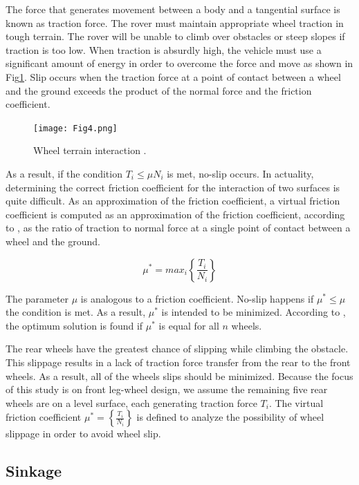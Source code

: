 \documentclass[default,iicol]{sn-jnl}
\theoremstyle{thmstyleone}
\theoremstyle{thmstyletwo}
\theoremstyle{thmstylethree}
\begin{document}
The force that generates movement between a body and a tangential surface is known as traction force. The rover must maintain appropriate wheel traction in tough terrain. The rover will be unable to climb over obstacles or steep slopes if traction is too low. When traction is absurdly high, the vehicle must use a significant amount of energy in order to overcome the force and move as shown in Fig\ref{fig4}. Slip occurs when the traction force at a point of contact between a wheel and the ground exceeds the product of the normal force and the friction coefficient.

\begin{figure}[ht]
\centering
\texttt{[image: Fig4.png]}
\caption{Wheel terrain interaction \cite{bib5}.}\label{fig4}
\end{figure}

As a result, if the condition $T_{i} \leq \mu N_i$ is met, no-slip occurs. In actuality, determining the correct friction coefficient for the interaction of two surfaces is quite difficult. As an approximation of the friction coefficient, a virtual friction coefficient is computed as an approximation of the friction coefficient, according to \cite{bib7}, as the ratio of traction to normal force at a single point of contact between a wheel and the ground.

\begin{equation}
{\mu^{ \ast }= max_i \left \{\frac{T_i}{N_i}\right\} }
\end{equation}

The parameter $\mu$ is analogous to a friction coefficient. No-slip happens if ${\mu^{ \ast } \leq \mu} $ the condition is met. As a result, $\mu^{\ast }$ is intended to be minimized. According to \cite{bib7} \cite{bib8}, the optimum solution is found if $\mu^{\ast }$ is equal for all $n$ wheels.

The rear wheels have the greatest chance of slipping while climbing the obstacle. This slippage results in a lack of traction force transfer from the rear to the front wheels. As a result, all of the wheels slips should be minimized. Because the focus of this study is on front leg-wheel design, we assume the remaining five rear wheels are on a level surface, each generating traction force $T_{i}$. The virtual friction coefficient ${\mu^{\ast }= \left \{\frac{T_i}{N_i}\right\} }$ is defined to analyze the possibility of wheel slippage in order to avoid wheel slip.

\subsection{Sinkage}\label{subsec4}
\end{document}
